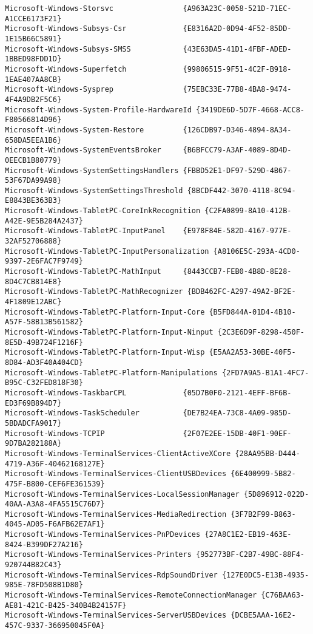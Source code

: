 \documentclass{report}
\begin{document}
\begin{lstlisting}[breaklines=true,basicstyle=\tiny]
Microsoft-Windows-Storsvc                {A963A23C-0058-521D-71EC-A1CCE6173F21}
Microsoft-Windows-Subsys-Csr             {E8316A2D-0D94-4F52-85DD-1E15B66C5891}
Microsoft-Windows-Subsys-SMSS            {43E63DA5-41D1-4FBF-ADED-1BBED98FDD1D}
Microsoft-Windows-Superfetch             {99806515-9F51-4C2F-B918-1EAE407AA8CB}
Microsoft-Windows-Sysprep                {75EBC33E-77B8-4BA8-9474-4F4A9DB2F5C6}
Microsoft-Windows-System-Profile-HardwareId {3419DE6D-5D7F-4668-ACC8-F80566814D96}
Microsoft-Windows-System-Restore         {126CDB97-D346-4894-8A34-658DA5EEA1B6}
Microsoft-Windows-SystemEventsBroker     {B6BFCC79-A3AF-4089-8D4D-0EECB1B80779}
Microsoft-Windows-SystemSettingsHandlers {FBBD52E1-DF97-529D-4B67-53F67DA99A98}
Microsoft-Windows-SystemSettingsThreshold {8BCDF442-3070-4118-8C94-E8843BE363B3}
Microsoft-Windows-TabletPC-CoreInkRecognition {C2FA0899-8A10-412B-A42E-9E5B284A2437}
Microsoft-Windows-TabletPC-InputPanel    {E978F84E-582D-4167-977E-32AF52706888}
Microsoft-Windows-TabletPC-InputPersonalization {A8106E5C-293A-4CD0-9397-2E6FAC7F9749}
Microsoft-Windows-TabletPC-MathInput     {8443CCB7-FEB0-4B8D-8E28-8D4C7CB814E8}
Microsoft-Windows-TabletPC-MathRecognizer {BDB462FC-A297-49A2-BF2E-4F1809E12ABC}
Microsoft-Windows-TabletPC-Platform-Input-Core {B5FD844A-01D4-4B10-A57F-58B13B561582}
Microsoft-Windows-TabletPC-Platform-Input-Ninput {2C3E6D9F-8298-450F-8E5D-49B724F1216F}
Microsoft-Windows-TabletPC-Platform-Input-Wisp {E5AA2A53-30BE-40F5-8D84-AD3F40A404CD}
Microsoft-Windows-TabletPC-Platform-Manipulations {2FD7A9A5-B1A1-4FC7-B95C-C32FED818F30}
Microsoft-Windows-TaskbarCPL             {05D7B0F0-2121-4EFF-BF6B-ED3F69B894D7}
Microsoft-Windows-TaskScheduler          {DE7B24EA-73C8-4A09-985D-5BDADCFA9017}
Microsoft-Windows-TCPIP                  {2F07E2EE-15DB-40F1-90EF-9D7BA282188A}
Microsoft-Windows-TerminalServices-ClientActiveXCore {28AA95BB-D444-4719-A36F-40462168127E}
Microsoft-Windows-TerminalServices-ClientUSBDevices {6E400999-5B82-475F-B800-CEF6FE361539}
Microsoft-Windows-TerminalServices-LocalSessionManager {5D896912-022D-40AA-A3A8-4FA5515C76D7}
Microsoft-Windows-TerminalServices-MediaRedirection {3F7B2F99-B863-4045-AD05-F6AFB62E7AF1}
Microsoft-Windows-TerminalServices-PnPDevices {27A8C1E2-EB19-463E-8424-B399DF27A216}
Microsoft-Windows-TerminalServices-Printers {952773BF-C2B7-49BC-88F4-920744B82C43}
Microsoft-Windows-TerminalServices-RdpSoundDriver {127E0DC5-E13B-4935-985E-78FD508B1D80}
Microsoft-Windows-TerminalServices-RemoteConnectionManager {C76BAA63-AE81-421C-B425-340B4B24157F}
Microsoft-Windows-TerminalServices-ServerUSBDevices {DCBE5AAA-16E2-457C-9337-366950045F0A}

\end{lstlisting}
\end{document}
